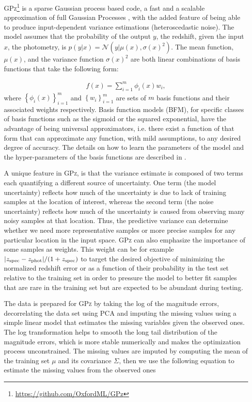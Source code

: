 \documentclass[usenatbib]{mn2e}
\begin{document}
\textsc{GPz}\footnote{\url{https://github.com/OxfordML/GPz}} \citep{Almosallam:16a,Almosallam:15b} is a sparse Gaussian process based code, a fast and a scalable approximation of full Gaussian Processes \citep{Rasmussen:06}, with the added feature of being able to produce input-dependent variance estimations (heteroscedastic noise). The model assumes that the probability of the output $y$, the redshift, given the input $x$, the photometry, is $p(y|x)=\mathcal{N}\left(y|\mu(x),\sigma(x)^{2}\right)$. The mean function, $\mu(x)$, and the variance function $\sigma(x)^{2}$ are both linear combinations of basis functions that take the following form:

\begin{align}
f(x)=\sum_{i=1}^{m}\phi_{i}(x)w_{i},
\end{align}
where $\left\{\phi_{i}(x)\right\}_{i=1}^{m}$ and $\left\{w_{i}\right\}_{i=1}^{m}$ are sets of $m$ basis functions and their associated weights respectively. Basis function models (BFM), for specific classes of basis functions such as the sigmoid or the squared exponential, have the advantage of being universal approximators, i.e. there exist a function of that form that can approximate any function, with mild assumptions, to any desired degree of accuracy. The details on how to learn the parameters of the model and the hyper-parameters of the basis functions are described in \citet{Almosallam:15b}.

A unique feature in \textsc{GPz}, is that the variance estimate is composed of two terms each quantifying a different source of uncertainty. One term (the model uncertainty) reflects how much of the uncertainty is due to lack of training samples at the location of interest, whereas the second term (the noise uncertainty) reflects how much of the uncertainty is caused from observing many noisy samples at that location. Thus, the predictive variance can determine whether we need more representative samples or more precise samples for any particular location in the input space. \textsc{GPz} can also emphasize the importance of some samples as weights. This weight can be for example $|z_{\rm{spec}}-z_{\rm{phot}}|/(1+z_{\rm{spec}})$ to target the desired objective of minimizing the normalized redshift error or as a function of their probability in the test set relative to the training set in order to pressure the model to better fit samples that are rare in the training set but are expected to be abundant during testing.

The data is prepared for \textsc{GPz} by taking the log of the magnitude errors, decorrelating the data set using PCA and imputing the missing values using a simple linear model that estimates the missing variables given the observed ones. The log transformation helps to smooth the long tail distribution of the magnitude errors, which is more stable numerically and makes the optimization process unconstrained. The missing values are imputed by computing the mean of the training set $\mu$ and its covariance $\Sigma$, then we use the following equation to estimate the missing values from the observed ones %
\end{document}
